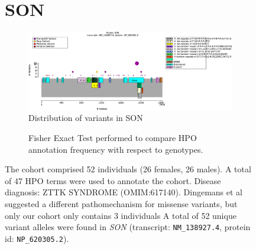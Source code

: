 \begin{figure}[htbp]
\section*{SON}
\centering
\begin{subfigure}[b]{0.95\textwidth}
\centering
\includegraphics[width=\textwidth]{img/SON_protein_diagram.pdf} 
\captionsetup{justification=raggedright,singlelinecheck=false}
\caption{Distribution of variants in SON}
\end{subfigure}

\vspace{2em}

\begin{subfigure}[b]{0.95\textwidth}
\centering
{}
\captionsetup{justification=raggedright,singlelinecheck=false}
\caption{Fisher Exact Test performed to compare HPO annotation frequency with respect to genotypes.}
\end{subfigure}

\vspace{2em}

\caption{ The cohort comprised 52 individuals (26 females, 26 males). A total of 47 HPO terms were used to annotate the cohort. Disease diagnosis: ZTTK SYNDROME (OMIM:617140). Dingemans et al \cite{PMID_34521999} suggested a different pathomechanism for missense variants, but only our cohort only contains 3 individuals A total of 52 unique variant alleles were found in \textit{SON} (transcript: \texttt{NM\_138927.4}, protein id: \texttt{NP\_620305.2}).}
\end{figure}
